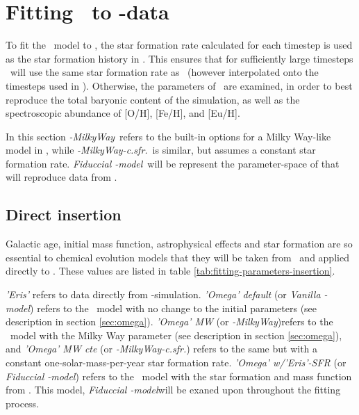 \section{Fitting \omegamodel\ to \eris-data}
\setlength{}
\newcommand\mwomega{\textit{\omegamodel-MilkyWay}}
\newcommand\mwcomega{\textit{\omegamodel-MilkyWay-c.sfr.}}
\newcommand\vanillaomega{\textit{Vanilla \omegamodel-model}}
\newcommand\fiduccialomega{\textit{Fiduccial \omegamodel-model}}

To fit the \omegamodel\ model to \eris, the star formation rate calculated for each timestep is used as the star formation history in \omegamodel.
This ensures that for sufficiently large timesteps \omegamodel\ will use the same star formation rate as \eris\ (however interpolated onto the timesteps used in \omegamodel).
Otherwise, the parameters of \omegamodel\ are examined, in order to best reproduce the total baryonic content of the simulation, as well as the spectroscopic abundance of [O/H], [Fe/H], and [Eu/H].

In this section \mwomega\ refers to the built-in options for a Milky Way-like model in \omegamodel, while \mwcomega\ is similar, but assumes a constant star formation rate. \fiduccialomega\ will be represent the parameter-space of \omegamodel that will reproduce data from \eris.

\subsection{Direct insertion}
\newcommand\insertion{ direct insertion}
Galactic age, initial mass function, astrophysical effects and star formation are so essential to chemical evolution models that they will be taken from \eris\ and applied directly to \omegamodel.
These values are listed in table \ref{tab:fitting-parameters-insertion}.

\textit{'Eris'} refers to data directly from \eris-simulation. \textit{'Omega' default} (or \vanillaomega) refers to the \omegamodel\ model with no change to the initial parameters (see description in section \ref{sec:omega}). \textit{'Omega' MW} (or \mwomega)refers to the \omegamodel\ model with the Milky Way parameter (see description in section \ref{sec:omega}), and \textit{'Omega' MW cte} (or \mwcomega) refers to the same but with a constant one-solar-mass-per-year star formation rate. \textit{'Omega' w/'Eris'-SFR} (or \fiduccialomega) refers to the \omegamodel\ model with the star formation and mass function from \eris. This model, \fiduccialomega will be exaned upon throughout the fitting process.

